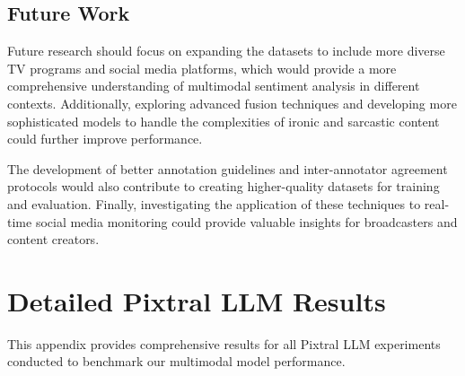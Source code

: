 \documentclass[letterpaper,journal]{IEEEtran}
\begin{document}
\subsection{Future Work}

Future research should focus on expanding the datasets to include more diverse TV programs and social media platforms, which would provide a more comprehensive understanding of multimodal sentiment analysis in different contexts. Additionally, exploring advanced fusion techniques and developing more sophisticated models to handle the complexities of ironic and sarcastic content could further improve performance.

The development of better annotation guidelines and inter-annotator agreement protocols would also contribute to creating higher-quality datasets for training and evaluation. Finally, investigating the application of these techniques to real-time social media monitoring could provide valuable insights for broadcasters and content creators.

\appendix
\section{Detailed Pixtral LLM Results}

This appendix provides comprehensive results for all Pixtral LLM experiments conducted to benchmark our multimodal model performance.
\end{document}

